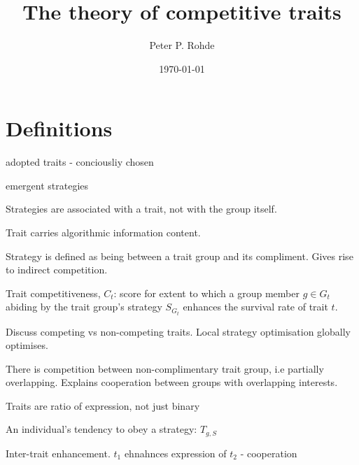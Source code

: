 \documentclass[aps,rmp,twocolumn,amsmath,amssymb,nofootinbib,superscriptaddress]{revtex4}
\begin{document}


%
%

\title{The theory of competitive traits}

%
%

\author{Peter P. Rohde}

\date{\today}

\frenchspacing

%
%

\begin{abstract}
\end{abstract}

\maketitle

\section{Definitions}

adopted traits - conciousliy chosen

emergent strategies




Strategies are associated with a trait, not with the group itself.

Trait carries algorithmic information content.

Strategy is defined as being between a trait group and its compliment. Gives rise to indirect competition.

Trait competitiveness, $C_t$: score for extent to which a group member $g\in G_t$ abiding by the trait group's strategy $S_{G_t}$ enhances the survival rate of trait $t$.

Discuss competing vs non-competing traits. Local strategy optimisation globally optimises.

There is competition between non-complimentary trait group, i.e partially overlapping. Explains cooperation between groups with overlapping interests.

Traits are ratio of expression, not just binary

An individual's tendency to obey a strategy: $T_{g,S}$

Inter-trait enhancement. $t_1$ ehnahnces expression of $t_2$ - cooperation
\end{document}

